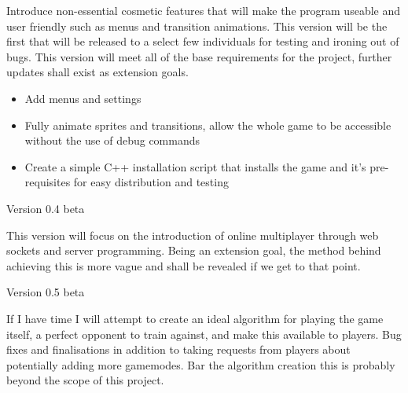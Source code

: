 \documentclass{article}
\begin{document}
Introduce non-essential cosmetic features that will make the program useable and user friendly such as menus and transition animations. This version will be the first that will be released to a select few individuals for testing and ironing out of bugs. This version will meet all of the base requirements for the project, further updates shall exist as extension goals.
\begin{itemize}
    \renewcommand\labelitemi{--}
    \item Add menus and settings
    \item Fully animate sprites and transitions, allow the whole game to be accessible without the use of debug commands
    \item Create a simple C++ installation script that installs the game and it's pre-requisites for easy distribution and testing
\end{itemize}

Version 0.4 beta

This version will focus on the introduction of online multiplayer through web sockets and server programming. Being an extension goal, the method behind achieving this is more vague and shall be revealed if we get to that point.

\vspace{0.3cm}

Version 0.5 beta

If I have time I will attempt to create an ideal algorithm for playing the game itself, a perfect opponent to train against, and make this available to players. Bug fixes and finalisations in addition to taking requests from players about potentially adding more gamemodes. Bar the algorithm creation this is probably beyond the scope of this project.
\end{document}
